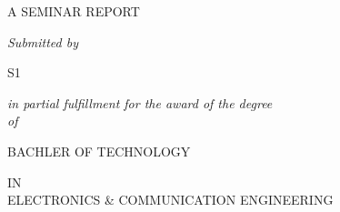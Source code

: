 \begin{titlepage}
	
	\thispagestyle{empty}
         
	\begin{center}
		\vspace*{.2cm}
		\textbf{\fontsize{18}{12}}
	\end{center}

	\vspace*{0.5cm}

	\begin{center}
		\fontsize{14}{12}\MakeUppercase{A SEMINAR REPORT}
	\end{center}

	\vspace*{0.5cm}

	\begin{center}
		\textit{\fontsize{14}{12}Submitted by}
	\end{center}

	\vspace*{0.5cm}

	\begin{center}
		\fontsize{16}{12}\selectfont S1
	\end{center}

    	\vspace{0.5cm}

	\begin{center}
		\textit{\fontsize{14}{12}in partial fulfillment for the award of the degree\\of\\}
	\end{center}

	\vspace*{0.5cm}

	\begin{center}
		\fontsize{16}{12}\MakeUppercase{BACHLER OF TECHNOLOGY}\\
	\end{center}

	\vspace*{0.5cm}

	\begin{center}
		\fontsize{14}{12}\MakeUppercase{IN}\\
		\fontsize{14}{12}\MakeUppercase{Electronics & Communication Engineering}\\
	\end{center}

	\vspace*{0.5cm}
	

\end{titlepage}
